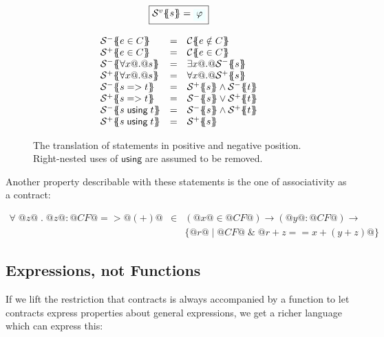 \begin{figure}\small
\setlength{\arraycolsep}{2pt}
\[\begin{array}{c}
\ruleform{\trs{v}{s} = \formula{\phi}} \\ \\
\begin{array}{lcl}
  \trs{-}{e \in C}         & = & \trc{e \notin C} \\
  \trs{+}{e \in C}         & = & \trc{e \in C} \\
  \trs{-}{\forall x @.@ s} & = & \exists x @.@ \trs{-}{s} \\
  \trs{+}{\forall x @.@ s} & = & \forall x @.@ \trs{+}{s} \\
  \trs{-}{s => t}          & = & \trs{+}{s} \land \trs{-}{t} \\
  \trs{+}{s => t}          & = & \trs{-}{s} \lor \trs{+}{t} \\
  \trs{-}{s \; \textsf{using} \; t} & = & \trs{-}{s} \land \trs{+}{t} \\
  \trs{+}{s \; \textsf{using} \; t} & = & \trs{+}{s} \\
\end{array}
\end{array}\]
\caption{
    The translation of statements in positive and negative
    position. Right-nested uses of $\textsf{using}$ are assumed to be
    removed.  \label{fig:stmt-trans}
}
\end{figure}

Another property describable with these statements is the one of
associativity as a contract:

\[\begin{array}{rcl}
\forall \; @z@ \; . \; @z@ : @CF@ => @(+)@
    & \in & ( @x@ \in @CF@ ) \to ( @y@ : @CF@ ) \to \\
    &     & \{ @r@ \mid @CF@ \; \& \; @r + z == x + (y + z)@ \}
\end{array}\]

\subsection{Expressions, not Functions}

If we lift the restriction that contracts is always accompanied by a
function to let contracts express properties about general
expressions, we get a richer language which can express this:

